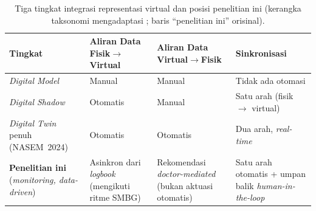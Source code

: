 \begin{table}[htbp]
\centering
\caption{Tiga tingkat integrasi representasi virtual dan posisi penelitian ini (kerangka taksonomi mengadaptasi \textcite{kritzinger2018}; baris ``penelitian ini'' orisinal).}
\label{tab:integrasi-dt}
\small
\begin{tabular}{@{}p{2.3cm}p{2.6cm}p{3cm}p{3.5cm}@{}}
\toprule
\textbf{Tingkat} & \textbf{Aliran Data Fisik$\rightarrow$Virtual} & \textbf{Aliran Data Virtual$\rightarrow$Fisik} & \textbf{Sinkronisasi} \\
\midrule
\emph{Digital Model} & Manual & Manual & Tidak ada otomasi \\[2pt]
\emph{Digital Shadow} & Otomatis & Manual & Satu arah (fisik $\rightarrow$ virtual) \\[2pt]
\emph{Digital Twin} penuh (NASEM~2024) & Otomatis & Otomatis & Dua arah, \emph{real-time} \\[2pt]
\textbf{Penelitian ini} (\emph{monitoring, data-driven}) & Asinkron dari \emph{logbook} (mengikuti ritme SMBG) & Rekomendasi \emph{doctor-mediated} (bukan aktuasi otomatis) & Satu arah otomatis + umpan balik \emph{human-in-the-loop} \\
\bottomrule
\end{tabular}
\end{table}
